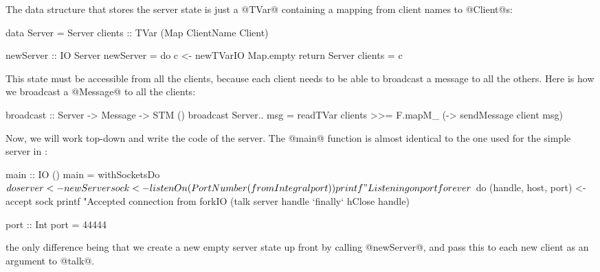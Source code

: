 The data structure that stores the server state is just a @TVar@
containing a mapping from client names to @Client@s:

\begin{haskell}
data Server = Server
  { clients :: TVar (Map ClientName Client)
  }

newServer :: IO Server
newServer = do
  c <- newTVarIO Map.empty
  return Server { clients = c }
\end{haskell}

This state must be accessible from all the clients, because each
client needs to be able to broadcast a message to all the others.
Here is how we broadcast a @Message@ to all the clients:

\begin{haskell}
broadcast :: Server -> Message -> STM ()
broadcast Server{..} msg =
    readTVar clients >>= F.mapM_ (\client -> sendMessage client msg)
\end{haskell}

Now, we will work top-down and write the code of the server.  The
@main@ function is almost identical to the one used for the simple
server in :

\begin{haskell}
main :: IO ()
main = withSocketsDo $ do
  server <- newServer
  sock <- listenOn (PortNumber (fromIntegral port))
  printf "Listening on port %
  forever $ do
      (handle, host, port) <- accept sock
      printf "Accepted connection from %
      forkIO (talk server handle `finally` hClose handle)

port :: Int
port = 44444
\end{haskell}

\noindent the only difference being that we create a new empty server
state up front by calling @newServer@, and pass this to each new
client as an argument to @talk@.




